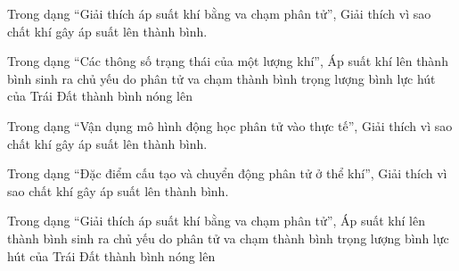 \begin{ex}
Trong dạng “Giải thích áp suất khí bằng va chạm phân tử”, Giải thích vì sao chất khí gây áp suất lên thành bình.
\choiceTF

\end{ex}

\begin{ex}
Trong dạng “Các thông số trạng thái của một lượng khí”, Áp suất khí lên thành bình sinh ra chủ yếu do
\choice
{\True phân tử va chạm thành bình}
{trọng lượng bình}
{lực hút của Trái Đất}
{thành bình nóng lên}
\end{ex}

\begin{ex}
Trong dạng “Vận dụng mô hình động học phân tử vào thực tế”, Giải thích vì sao chất khí gây áp suất lên thành bình.
\choiceTF

\end{ex}

\begin{ex}
Trong dạng “Đặc điểm cấu tạo và chuyển động phân tử ở thể khí”, Giải thích vì sao chất khí gây áp suất lên thành bình.
\choiceTF

\end{ex}

\begin{ex}
Trong dạng “Giải thích áp suất khí bằng va chạm phân tử”, Áp suất khí lên thành bình sinh ra chủ yếu do
\choice
{\True phân tử va chạm thành bình}
{trọng lượng bình}
{lực hút của Trái Đất}
{thành bình nóng lên}
\end{ex}

